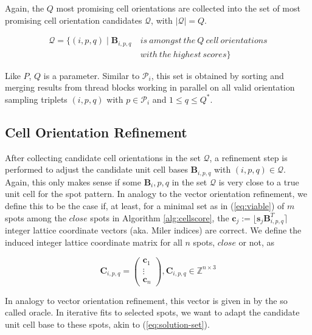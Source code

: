\documentclass[a4paper,10pt]{article}
\newcommand{\vect}[1]{\mathbf{#1}}
\newcommand{\mat}[1]{\mathbf{#1}}
\newcommand{\round}[1]{\lfloor #1 \rceil}
\begin{document}
Again, the $Q$ most promising cell orientations are collected into the set of most promising cell orientation candidates $\mathcal{Q}$, with $|\mathcal{Q}|=Q$.

\[
\begin{split}
\mathcal{Q} = \{ (i,p,q) \mid \mat{B}_{i,p,q}\ &is\ amongst\ the\ Q\ cell\ orientations \\
                                               &with\ the\ highest\ scores \}
\end{split}
\]

Like $P$, $Q$ is a parameter. Similar to $\mathcal{P}_i$, this set is obtained by sorting and merging results from thread blocks working in parallel on all valid orientation sampling triplets $(i,p,q)$ with $p\in \mathcal{P}_i$ and $1\leq q\leq Q^*$.

\subsection{Cell Orientation Refinement}

After collecting candidate cell orientations in the set $\mathcal{Q}$, a refinement step is performed to adjust the candidate unit cell bases $\mat{B}_{i,p,q}$ with $(i,p,q)\in \mathcal{Q}$. Again, this only makes sense if some $\mat{B}_i,p,q$ in the set $\mathcal{Q}$ is very close to a true unit cell for the spot pattern. In analogy to the vector orientation refinement, we define this to be the case if, at least, for a minimal set as in (\ref{eq:viable}) of $m$ spots among the $close$ spots in Algorithm \ref{alg:cellscore}, the $\vect{c}_j := \round{\vect{s}_j\mat{B}_{i,p,q}^T}$ integer lattice coordinate vectors (aka. Miler indices) are correct. We define the induced integer lattice coordinate matrix for all $n$ spots, $close$ or not, as

\[
 \mat{C}_{i,p,q} = \begin{pmatrix} \vect{c}_1 \\ \vdots \\ \vect{c}_n \end{pmatrix}, \mat{C}_{i,p,q}\in \mathbb{Z}^{n\times 3}
\]

In analogy to vector orientation refinement, this vector is given in \cite{toro-indexer} by the so called oracle. In iterative fits to selected spots, we want to adapt the candidate unit cell base to these spots, akin to (\ref{eq:solution-set}).
\end{document}
